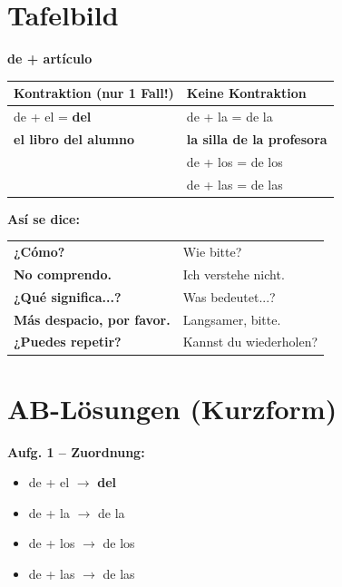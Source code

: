 \documentclass[11pt,a4paper]{article}
\newcommand{\es}[1]{\textbf{#1}}
\begin{document}
\section*{Tafelbild}

\begin{tcolorbox}[colback=white, colframe=grau]
\textbf{de + artículo}

\vspace{0.3cm}
\begin{tabular}{p{6cm}|p{6cm}}
\textbf{Kontraktion (nur 1 Fall!)} & \textbf{Keine Kontraktion} \\
\hline
de + el = \textbf{del} & de + la = de la \\
\es{el libro \textbf{del} alumno} & \es{la silla \textbf{de la} profesora} \\
& de + los = de los \\
& de + las = de las \\
\end{tabular}

\vspace{0.5cm}

\textbf{Así se dice:}

\vspace{0.2cm}
\begin{tabular}{ll}
\es{¿Cómo?} & Wie bitte? \\
\es{No comprendo.} & Ich verstehe nicht. \\
\es{¿Qué significa...?} & Was bedeutet...? \\
\es{Más despacio, por favor.} & Langsamer, bitte. \\
\es{¿Puedes repetir?} & Kannst du wiederholen? \\
\end{tabular}
\end{tcolorbox}

\vspace{0.5cm}

\section*{AB-Lösungen (Kurzform)}

\textbf{Aufg. 1 -- Zuordnung:}
\begin{itemize}[nosep]
    \item de + el $\rightarrow$ \textbf{del}
    \item de + la $\rightarrow$ de la
    \item de + los $\rightarrow$ de los
    \item de + las $\rightarrow$ de las
\end{itemize}
\end{document}
